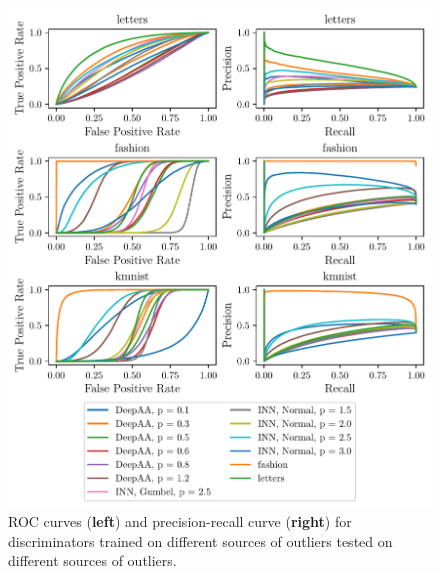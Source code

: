 \begin{figure}[htpb]
    \centering
    \includegraphics{figures/samples/emnist_disc_curve.pdf}
    \caption{ROC curves (\textbf{left}) and precision-recall curve (\textbf{right}) for
    discriminators trained on different sources of outliers tested on different
    sources of outliers.}%
    \label{fig:emnist_stat_disc}
\end{figure}

